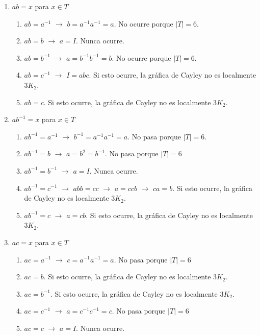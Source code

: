 \documentclass[12pt]{book}
\theoremstyle{definition}
\begin{document}
\begin{enumerate}

\item $ab=x$ para $x\in T$

  \begin{enumerate}
  \item $ab=a^{-1}$ $\rightarrow$ $b=a^{-1}a^{-1}=a$. No ocurre porque
    $|T|=6$.
  \item $ab=b$ $\rightarrow$ $a=I$. Nunca ocurre.
  \item $ab=b^{-1}$ $\rightarrow$ $a=b^{-1}b^{-1}=b$. No ocurre porque
    $|T|=6$.
  \item $ab=c^{-1}$ $\rightarrow$ $I=abc$. Si esto ocurre, la gráfica
    de Cayley no es localmente $3K_2$.
  \item $ab=c$. Si esto ocurre, la gráfica de Cayley no es localmente
    $3K_2$.
  \end{enumerate}

\item $ab^{-1}=x$ para $x\in T$
  \begin{enumerate}
  \item $ab^{-1}=a^{-1}$ $\rightarrow$ $b^{-1}=a^{-1}a^{-1}=a$. No
    pasa porque $|T|=6$.
  \item $ab^{-1}=b$ $\rightarrow$ $a=b^2=b^{-1}$. No pasa porque
    $|T|=6$
  \item $ab^{-1}=b^{-1}$ $\rightarrow$ $a=I$. Nunca ocurre.
  \item $ab^{-1}=c^{-1}$ $\rightarrow$ $abb=cc$ $\rightarrow$ $a=ccb$
    $\rightarrow$ $ca=b$. Si esto ocurre, la gráfica de Cayley no es
    localmente $3K_2$.
  \item $ab^{-1}=c$ $\rightarrow$ $a=cb$. Si esto ocurre, la gráfica
    de Cayley no es localmente $3K_2$.
  \end{enumerate}

\item $ac=x$ para $x\in T$
  \begin{enumerate}
  \item $ac=a^{-1}$ $\rightarrow$ $c=a^{-1}a^{-1}=a$. No pasa porque
    $|T|=6$
  \item $ac=b$. Si esto ocurre, la gráfica de Cayley no es localmente
    $3K_2$.
  \item $ac=b^{-1}$.  Si esto ocurre, la gráfica de Cayley no es
    localmente $3K_2$.
  \item $ac=c^{-1}$ $\rightarrow$ $a=c^{-1}c^{-1}=c$. No pasa porque
    $|T|=6$
  \item $ac=c$ $\rightarrow$ $a=I$. Nunca ocurre.
  \end{enumerate}


\end{enumerate}
\end{document}
